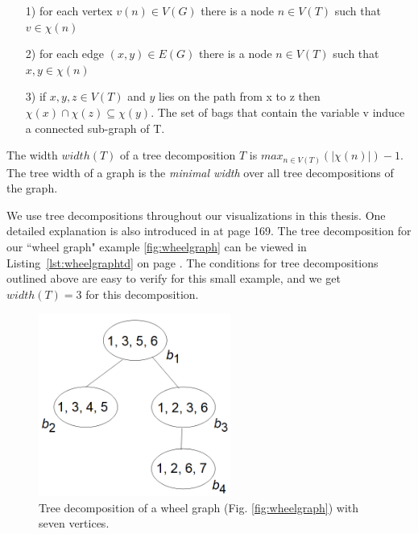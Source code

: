 \documentclass[a4paper, 12pt, bibliography=totoc]{scrartcl}
\begin{document}
\begin{itemize}
	\item[1)] for each vertex $v(n) \in V(G)$ there is a node $n \in V(T)$ such that $v \in \chi(n)$
	\item[2)] for each edge $(x,y) \in E(G)$ there is a node $n\in V(T)$ such that $x,y \in\chi(n)$
	\item[3)] if $x,y,z \in V(T)$ and $y$ lies on the path from x to z then $\chi(x) \cap \chi(z) \subseteq \chi(y)$. The set of bags that contain the variable v induce a connected sub-graph of T.
\end{itemize}
The width $width(T)$ of a tree decomposition $T$ is $max_{n\in V(T)}(|\chi(n)|)-1$.
The tree width of a graph is the \textit{minimal width} over all tree decompositions of the graph. 


We use tree decompositions throughout our visualizations in this thesis. One detailed explanation is also introduced in \cite{pcgp2019} at page 169.
The tree decomposition for our ``wheel graph" example \ref{fig:wheelgraph} can be viewed in Listing~\ref{lst:wheelgraphtd} on page \pageref{lst:wheelgraphtd}. The conditions for tree decompositions outlined above are easy to verify for this small example, and we get  $width(T)=3$ for this decomposition.
\begin{figure}[h]
	\centering
	\includegraphics[height=6cm]{images/TDWheelgraph7.png}
		\caption[Tree decomposition of the wheel graph]{Tree decomposition of a wheel graph (Fig. \ref{fig:wheelgraph})	with seven vertices.}
	\label{fig:tdweelgraph7}
\end{figure}
\end{document}
